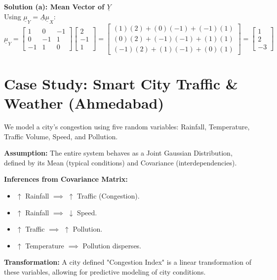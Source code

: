 \documentclass[12pt]{article}
\begin{document}
\textbf{Solution (a): Mean Vector of $\underline{Y}$} \\
Using $\underline{\mu}_Y = \underline{A}\underline{\mu}_X$:
\[
\underline{\mu}_Y = \begin{bmatrix} 1 & 0 & -1 \\ 0 & -1 & 1 \\ -1 & 1 & 0 \end{bmatrix} \begin{bmatrix} 2 \\ -1 \\ 1 \end{bmatrix} = \begin{bmatrix} (1)(2) + (0)(-1) + (-1)(1) \\ (0)(2) + (-1)(-1) + (1)(1) \\ (-1)(2) + (1)(-1) + (0)(1) \end{bmatrix} = \begin{bmatrix} 1 \\ 2 \\ -3 \end{bmatrix}
\]

\section{Case Study: Smart City Traffic \& Weather (Ahmedabad)}
We model a city's congestion using five random variables: Rainfall, Temperature, Traffic Volume, Speed, and Pollution.

\textbf{Assumption:} The entire system behaves as a Joint Gaussian Distribution, defined by its Mean (typical conditions) and Covariance (interdependencies).

\textbf{Inferences from Covariance Matrix:} 
\begin{itemize}
    \item $\uparrow$ Rainfall $\implies$ $\uparrow$ Traffic (Congestion).
    \item $\uparrow$ Rainfall $\implies$ $\downarrow$ Speed.
    \item $\uparrow$ Traffic $\implies$ $\uparrow$ Pollution.
    \item $\uparrow$ Temperature $\implies$ Pollution disperses.
\end{itemize}

\textbf{Transformation:} A city defined "Congestion Index" is a linear transformation of these variables, allowing for predictive modeling of city conditions.
\end{document}
